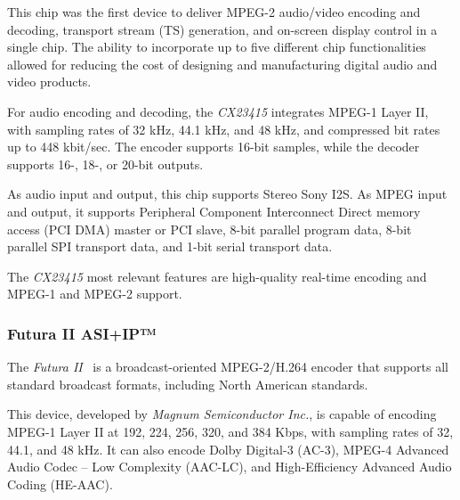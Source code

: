 This chip was the first device to deliver MPEG-2 audio/video encoding and decoding, transport stream (TS) generation, and on-screen display control in a single chip. The ability to incorporate up to five different chip functionalities allowed for reducing the cost of designing and manufacturing digital audio and video products.



For audio encoding and decoding, the \textit{CX23415} integrates MPEG-1 Layer II, with sampling rates of 32 kHz, 44.1 kHz, and 48 kHz, and compressed bit rates up to 448 kbit/sec. The encoder supports 16-bit samples, while the decoder supports 16-, 18-, or 20-bit outputs.

As audio input and output, this chip supports Stereo Sony I2S. As MPEG input and output, it supports Peripheral Component Interconnect Direct memory access (PCI DMA) master or PCI slave, 8-bit parallel program data, 8-bit parallel SPI transport data, and 1-bit serial transport data.

The \textit{CX23415} most relevant features are high-quality real-time encoding and MPEG-1 and MPEG-2 support.

\subsubsection{Futura II ASI+IP™}

The \textit{Futura II}~\cite{futura} is a broadcast-oriented MPEG-2/H.264 encoder that supports all standard broadcast formats, including North American standards. 

This device, developed by \textit{Magnum Semiconductor Inc.}, is capable of encoding MPEG-1 Layer II at 192, 224, 256, 320, and 384 Kbps, with sampling rates of 32, 44.1, and 48 kHz. It can also encode Dolby Digital-3 (AC-3), MPEG-4 Advanced Audio Codec – Low Complexity (AAC-LC), and High-Efficiency Advanced Audio Coding (HE-AAC).

